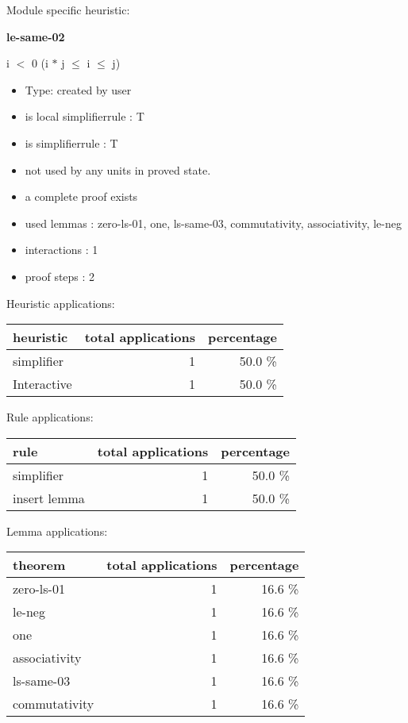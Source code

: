\documentclass[a4paper]{article}
\begin{document}
Module specific heuristic:

\pagebreak

{\LARGE\bf le-same-02}\label{lemma-le-same-02}

\medskip

 \Fol i $<$ 0 \Imp (i $*$ j $\le$ i  $\le$ j)

\begin{itemize}

\item Type: created by user

\item is local simplifierrule : T
\item is simplifierrule : T
\item not used by any units in proved state.
\item       a complete proof exists
\item       used lemmas  : zero-ls-01, one, ls-same-03, commutativity, associativity, le-neg
\item       interactions : 1
\item       proof steps  : 2
\end{itemize}

\medskip


Heuristic applications:

\begin{supertabular}{l|r|r}
heuristic	& total applications & percentage \\ \hline
simplifier & 1 & 50.0 \% \\
Interactive & 1 & 50.0 \% \\

\end{supertabular}

Rule applications:

\begin{supertabular}{l|r|r}
rule	        & total applications & percentage \\ \hline
simplifier & 1 & 50.0 \% \\
insert lemma & 1 & 50.0 \% \\

\end{supertabular}

Lemma applications:

\begin{supertabular}{l|r|r}
theorem	        & total applications & percentage \\ \hline
zero-ls-01 & 1 & 16.6 \% \\
le-neg & 1 & 16.6 \% \\
one & 1 & 16.6 \% \\
associativity & 1 & 16.6 \% \\
ls-same-03 & 1 & 16.6 \% \\
commutativity & 1 & 16.6 \% \\

\end{supertabular}
\end{document}
